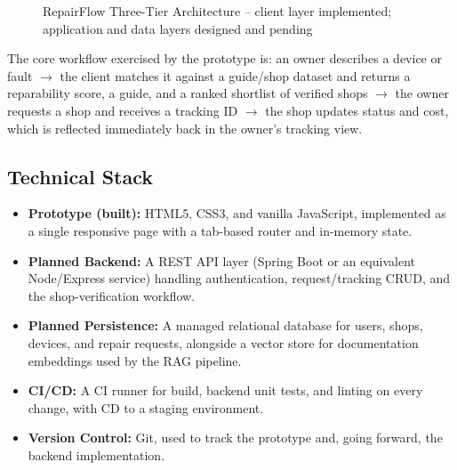 \documentclass[11pt,a4paper]{report}
\begin{document}
\begin{figure}[h!]
\centering
{}
\caption{RepairFlow Three-Tier Architecture -- client layer implemented; application and data layers designed and pending}
\end{figure}

The core workflow exercised by the prototype is: an owner describes a device or fault $\rightarrow$ the client matches it against a guide/shop dataset and returns a reparability score, a guide, and a ranked shortlist of verified shops $\rightarrow$ the owner requests a shop and receives a tracking ID $\rightarrow$ the shop updates status and cost, which is reflected immediately back in the owner's tracking view.

\subsection{Technical Stack}

\begin{itemize}
    \item \textbf{Prototype (built):} HTML5, CSS3, and vanilla JavaScript, implemented as a single responsive page with a tab-based router and in-memory state.
    \item \textbf{Planned Backend:} A REST API layer (Spring Boot or an equivalent Node/Express service) handling authentication, request/tracking CRUD, and the shop-verification workflow.
    \item \textbf{Planned Persistence:} A managed relational database for users, shops, devices, and repair requests, alongside a vector store for documentation embeddings used by the RAG pipeline.
    \item \textbf{CI/CD:} A CI runner for build, backend unit tests, and linting on every change, with CD to a staging environment.
    \item \textbf{Version Control:} Git, used to track the prototype and, going forward, the backend implementation.
\end{itemize}
\end{document}
